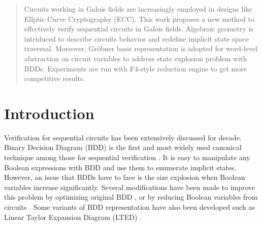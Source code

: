 \documentclass{acm_proc_article-sp}
\begin{document}
\date{07 Nov 2013}

\maketitle
\begin{abstract}
Circuits working in Galois fields are increasingly employed in designs like Ellptic Curve Cryptography (ECC). 
This work proposes a new method to effectively verify sequential circuits in Galois fields. Algebraic geometry
is intriduced to describe circuits behavior and redefine implicit state space traversal. Moreover, Gr\"obner basis
representation is adopted for word-level abstraction on circuit variables to address state explosion problem
with BDDs. Experiments are run with F4-style reduction engine to get more competitive results.
\end{abstract}




\section{Introduction}
Verification for sequential circuits has been extensively discussed for decade. Binary Decision Diagram (BDD) is the first
and most widely used canonical technique among those for sequential verification \cite{touati1990implicit}. It is easy to
manipulate any Boolean expressions with BDD and use them to enumerate implicit states. However, an issue that BDDs have to
face is the size explosion when Boolean variables increase significantly. Several modifications have been made to improve
this problem by optimizing original BDD \cite{gunther2001application} \cite{narayan1997reachability}, or by reducing Boolean
variables from circuits\cite{burch1991representing} \cite{jiang2003verification}. Some variants of BDD representation
have also been developed such as Linear Taylor Expansion Diagram (LTED) \cite{alizadeh2009sequential}.
\end{document}
